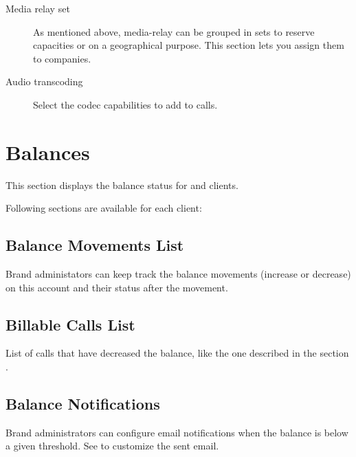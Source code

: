 \documentclass[letterpaper,10pt,english]{sphinxmanual}
\begin{document}
\begin{description}
\item[{Media relay set}] \leavevmode{}\label{brand/wholesale:term-media-relay-set}
As mentioned above, media-relay can be grouped in sets to reserve capacities
or on a geographical purpose. This section lets you assign them to companies.

\item[{Audio transcoding}] \leavevmode{}\label{brand/wholesale:term-audio-transcoding}
Select the codec capabilities to add to calls.

\end{description}


\section{Balances}
\label{brand/balances::doc}\label{brand/balances:balances}
This section displays the balance status for {\hyperref[brand/billing/bill_a_call:prepaid\string-billing]{}} and {\hyperref[brand/billing/bill_a_call:pseudo\string-prepaid\string-billing]{}} clients.

Following sections are available for each client:


\subsection{Balance Movements List}
\label{brand/balances:balance-movements-list}
Brand administators can keep track the balance movements (increase or decrease) on this account and their status
after the movement.


\subsection{Billable Calls List}
\label{brand/balances:billable-calls-list}
List of calls that have decreased the balance, like the one described in the section {\hyperref[brand/billing/billable_calls:billable\string-calls]{}}.


\subsection{Balance Notifications}
\label{brand/balances:balance-notifications}
Brand administrators can configure email notifications when the balance is below a given threshold. See
{\hyperref[brand/notifications:notification\string-templates]{}} to customize the sent email.
\end{document}

